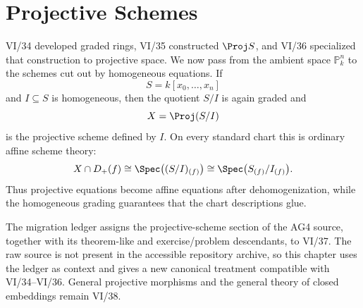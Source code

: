 \chapter{Projective Schemes}
\label{ch:vi37-projective-schemes}

VI/34 developed graded rings, VI/35 constructed \(\Proj S\), and VI/36 specialized that construction to projective space.  We now pass from the ambient space \(\mathbb P^n_k\) to the schemes cut out by homogeneous equations.  If
\[
  S=k[x_0,\ldots,x_n]
\]
and \(I\subseteq S\) is homogeneous, then the quotient \(S/I\) is again graded and
\[
  X=\Proj(S/I)
\]
is the projective scheme defined by \(I\).  On every standard chart this is ordinary affine scheme theory:
\[
  X\cap D_+(f)\cong \Spec\bigl((S/I)_{(f)}\bigr)
  \cong \Spec\bigl(S_{(f)}/I_{(f)}\bigr).
\]
Thus projective equations become affine equations after dehomogenization, while the homogeneous grading guarantees that the chart descriptions glue.

The migration ledger assigns the projective-scheme section of the AG4 source, together with its theorem-like and exercise/problem descendants, to VI/37.  The raw source is not present in the accessible repository archive, so this chapter uses the ledger as context and gives a new canonical treatment compatible with VI/34--VI/36.  General projective morphisms and the general theory of closed embeddings remain VI/38.

